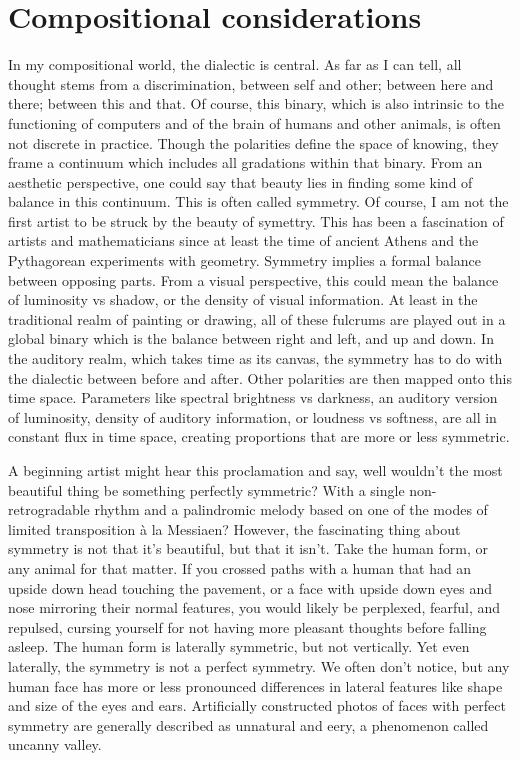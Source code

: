 \documentclass[12pt,twoside,maitrise]{dms_ks}
\theoremstyle{definition}
\begin{document}
\section{Compositional considerations}

In my compositional world, the dialectic is central.
As far as I can tell, all thought stems from a discrimination, between self and other; between here and there; between this and that.
Of course, this binary, which is also intrinsic to the functioning of computers and of the brain of humans and other animals, is often not discrete in practice.
Though the polarities define the space of knowing, they frame a continuum which includes all gradations within that binary.
From an aesthetic perspective, one could say that beauty lies in finding some kind of balance in this continuum.
This is often called symmetry.
Of course, I am not the first artist to be struck by the beauty of symettry.
This has been a fascination of artists and mathematicians since at least the time of ancient Athens and the Pythagorean experiments with geometry.
Symmetry implies a formal balance between opposing parts.
From a visual perspective, this could mean the balance of luminosity vs shadow, or the density of visual information.
At least in the traditional realm of painting or drawing, all of these fulcrums are played out in a global binary which is the balance between right and left, and up and down.
In the auditory realm, which takes time as its canvas, the symmetry has to do with the dialectic between before and after.
Other polarities are then mapped onto this time space.
Parameters like spectral brightness vs darkness, an auditory version of luminosity, density of auditory information, or loudness vs softness, are all in constant flux in time space, creating proportions that are more or less symmetric.

A beginning artist might hear this proclamation and say, well wouldn’t the most beautiful thing be something perfectly symmetric?
With a single non-retrogradable rhythm and a palindromic melody based on one of the modes of limited transposition à la Messiaen?
However, the fascinating thing about symmetry is not that it’s beautiful, but that it isn’t.
Take the human form, or any animal for that matter.
If you crossed paths with a human that had an upside down head touching the pavement, or a face with upside down eyes and nose mirroring their normal features, you would likely be perplexed, fearful, and repulsed, cursing yourself for not having more pleasant thoughts before falling asleep.
The human form is laterally symmetric, but not vertically.
Yet even laterally, the symmetry is not a perfect symmetry.
We often don’t notice, but any human face has more or less pronounced differences in lateral features like shape and size of the eyes and ears.
Artificially constructed photos of faces with perfect symmetry are generally described as unnatural and eery, a phenomenon called uncanny valley.
\end{document}
